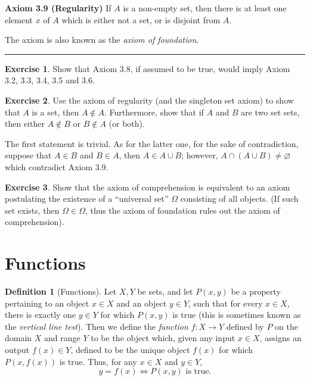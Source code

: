 \documentclass[
]{book}
\theoremstyle{definition}
\newtheorem{definition}{Definition}[chapter]
\theoremstyle{definition}
\theoremstyle{definition}
\newtheorem{exercise}{Exercise}[chapter]
\theoremstyle{definition}
\theoremstyle{remark}
\begin{document}
\textbf{Axiom 3.9 (Regularity)} If \(A\) is a non-empty set, then there is at least one element \(x\) of \(A\) which is either not a set, or is disjoint from \(A\).

The axiom is also known as the \emph{axiom of foundation}.

\begin{center}\rule{0.5\linewidth}{0.5pt}\end{center}

\begin{exercise}
Show that Axiom 3.8, if assumed to be true, would imply Axiom 3.2, 3.3, 3.4, 3.5 and 3.6.
\end{exercise}

\begin{exercise}
Use the axiom of regularity (and the singleton set axiom) to show that \(A\) is a set, then \(A\not \in A\). Furthermore, show that if \(A\) and \(B\) are two set sets, then either \(A\not\in B\) or \(B\not\in A\) (or both).
\end{exercise}

The first statement is trivial. As for the latter one, for the sake of contradiction, suppose that \(A\in B\) and \(B\in A\), then \(A\in A\cup B\); however, \(A\cap (A\cup B) \ne \varnothing\) which contradict Axiom 3.9.

\begin{exercise}
Show that the axiom of comprehension is equivalent to an axiom postulating the existence of a ``universal set'' \(\Omega\) consisting of all objects. (If such set exists, then \(\Omega \in \Omega\), thus the axiom of foundation rules out the axiom of comprehension).
\end{exercise}

\section{Functions}\label{functions}

\begin{definition}[Functions]
\protect\hypertarget{def:func}{}\label{def:func}Let \(X,Y\) be sets, and let \(P(x,y)\) be a property pertaining to an object \(x\in X\) and an object \(y\in Y\), such that for every \(x\in X\), there is exactly one \(y\in Y\) for which \(P(x,y)\) is true (this is sometimes known as the \emph{vertical line test}). Then we define the \emph{function} \(f:X\to Y\) defined by \(P\) on the domain \(X\) and range \(Y\) to be the object which, given any input \(x\in X\), assigns an output \(f(x) \in Y\), defined to be the unique object \(f(x)\) for which \(P(x,f(x))\) is true. Thus, for any \(x\in X\) and \(y\in Y\),
\[
y=f(x) \iff P(x,y) \text{ is true.}
\]
\end{definition}
\end{document}
